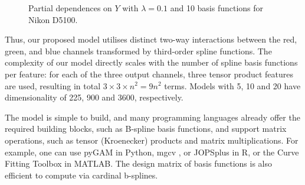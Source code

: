 \begin{figure}
    \centering
    \caption{Partial dependences on $Y$ with $\lambda = 0.1$ and 10 basis functions for Nikon D5100.}
    \label{fig:partialdep}
\end{figure}

Thus, our proposed model utilises distinct two-way interactions between the red, green, and blue channels transformed by third-order spline functions. The complexity of our model directly scales with the number of spline basis functions per feature:  for each of the three output channels, three tensor product features are used, resulting in total $3\times 3 \times n^2=9n^2$ terms. Models with 5, 10 and 20 have dimensionality of 225, 900 and 3600, respectively.

The model is simple to build, and many programming languages already offer the required building blocks, such as B-spline basis functions, and support matrix operations, such as tensor (Kroenecker) products and matrix multiplications. For example, one can use pyGAM \cite{serven2018pygam} in Python, mgcv \cite{wood2001mgcv}, or JOPSplus \cite{psplinesJoysPsplines} in R, or the Curve Fitting Toolbox \cite{MatlabCurveFitting2024} in MATLAB. The design matrix of basis functions is also efficient to compute via cardinal b-splines.